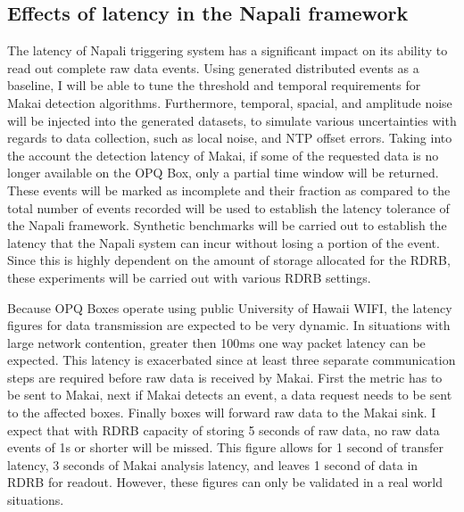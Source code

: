 \subsection{Effects of latency in the Napali framework} \label{iexp:sec:lat}
The latency of Napali triggering system has a significant impact on its ability to read out complete raw data events.
Using generated distributed events as a baseline, I will be able to tune the threshold and temporal requirements for Makai detection algorithms.
Furthermore, temporal, spacial, and amplitude noise will be injected into the generated datasets, to simulate various uncertainties with regards to data collection, such as local noise, and NTP offset errors.
Taking into the account the detection latency of Makai, if some of the requested data is no longer available on the OPQ Box, only a partial time window will be returned.
These events will be marked as incomplete and their fraction as compared to the total number of events recorded will be used to establish the latency tolerance of the Napali framework.
Synthetic benchmarks will be carried out to establish the latency that the Napali system can incur without losing a portion of the event.
Since this is highly dependent on the amount of storage allocated for the RDRB, these experiments will be carried out with various RDRB settings.

Because OPQ Boxes operate using public University of Hawaii WIFI, the latency figures for data transmission are expected to be very dynamic.
In situations with large network contention, greater then 100ms one way packet latency can be expected.
This latency is exacerbated since at least three separate communication steps are required before raw data is received by Makai.
First the metric has to be sent to Makai, next if Makai detects an event, a data request needs to be sent to the affected boxes.
Finally boxes will forward raw data to the Makai sink.
I expect that with RDRB capacity of storing 5 seconds of raw data, no raw data events of 1s or shorter will be missed.
This figure allows for 1 second of transfer latency, 3 seconds of Makai analysis latency, and leaves 1 second of data in RDRB for readout.
However, these figures can only be validated in a real world situations.

